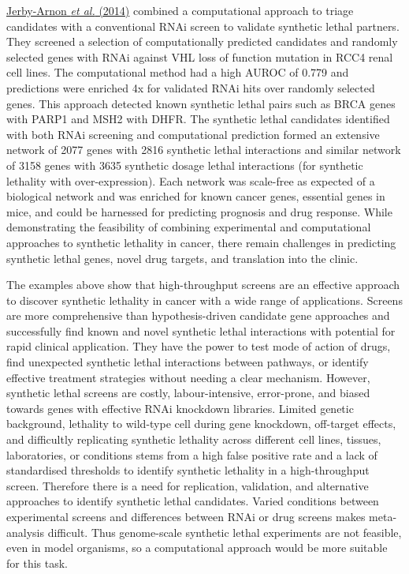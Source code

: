 \hyperlink{ENREF53}{Jerby-Arnon}\hyperlink{ENREF53}{\textit{ et
al.}}\hyperlink{ENREF53}{ (2014)} combined a computational approach to
triage candidates with a conventional RNAi screen to validate synthetic
lethal partners. They screened a selection of computationally
predicted candidates and randomly selected genes with RNAi against VHL
loss of function mutation in RCC4 renal cell lines. The computational
method had a high AUROC of 0.779 and predictions were enriched 4x for
validated RNAi hits over randomly selected genes. This approach
detected known synthetic lethal pairs such as BRCA genes with PARP1 and
MSH2 with DHFR. The synthetic lethal candidates identified with both
RNAi screening and computational prediction formed an extensive network
of 2077 genes with 2816 synthetic lethal interactions and similar
network of 3158 genes with 3635 synthetic dosage lethal interactions
(for synthetic lethality with over-expression). Each network was
scale-free as expected of a biological network and was enriched for
known cancer genes, essential genes in mice, and could be harnessed for
predicting prognosis and drug response. While demonstrating the
feasibility of combining experimental and computational approaches to
synthetic lethality in cancer, there remain challenges in predicting
synthetic lethal genes, novel drug targets, and translation into the
clinic. 


The examples above show that high-throughput screens are an effective
approach to discover synthetic lethality in cancer with a wide range of
applications. Screens are more comprehensive than hypothesis-driven
candidate gene approaches and successfully find known and novel
synthetic lethal interactions with potential for rapid clinical
application. They have the power to test mode of action of drugs,
find unexpected synthetic lethal interactions between pathways, or
identify effective treatment strategies without needing a clear
mechanism. However, synthetic lethal screens are costly,
labour-intensive, error-prone, and biased towards genes with effective
RNAi knockdown libraries. Limited genetic background, lethality to
wild-type cell during gene knockdown, off-target effects, and
difficultly replicating synthetic lethality across different cell
lines, tissues, laboratories, or conditions stems from a high false
positive rate and a lack of standardised thresholds to identify
synthetic lethality in a high-throughput screen. Therefore there is a
need for replication, validation, and alternative approaches to
identify synthetic lethal candidates. Varied conditions between
experimental screens and differences between RNAi or drug screens makes
meta-analysis difficult. Thus genome-scale synthetic lethal experiments
are not feasible, even in model organisms, so a computational approach
would be more suitable for this task. 


